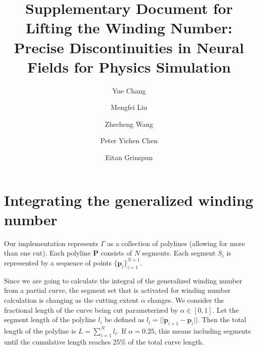 \documentclass[acmtog, nonacm]{acmart}
\begin{document}
\title{Supplementary Document for Lifting the Winding Number: \\ Precise Discontinuities in Neural Fields for Physics Simulation}

\author{Yue Chang}


\author{Mengfei Liu}


\author{Zhecheng Wang}

\author{Peter Yichen Chen}


\author{Eitan Grinspun}

\maketitle

\renewcommand{\theequation}{A.\arabic{equation}} %
\setcounter{equation}{0} %

\section{Integrating the generalized winding number}
Our implementation represents $\Gamma$ as a collection of polylines (allowing for more than one cut). Each polyline $ \mathbf{P} $ consists of $N$ segments. Each segment  $S_i$ is represented by a sequence of points $ \{\mathbf{p}_{i}\}_{i=1}^{N+1} $. 

Since we are going to calculate the integral of the generalized winding number from a partial curve, the segment set that is activated for winding number calculation is changing as the cutting extent $\alpha$ changes. We consider the fractional length of the curve being cut parameterized by $\alpha \in [0, 1]$. Let the segment length of the polyline $l_i$ be defined as $l_i = ||\mathbf{p}_{i+1} - \mathbf{p}_i||$. Then the total length of the polyline is $L = \sum_{i=1}^N l_i$. If $\alpha = 0.25$, this means including segments until the cumulative length reaches 25\% of the total curve length. 
\end{document}
